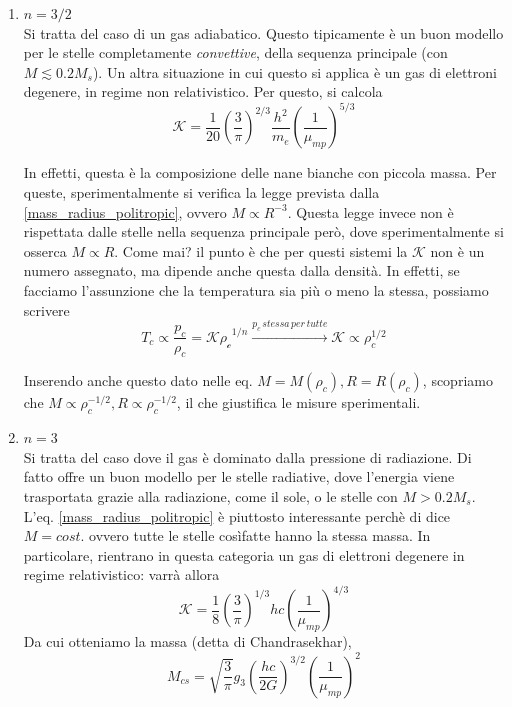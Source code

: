 \documentclass{report}
\begin{document}
    \begin{enumerate}
        \item $n = 3/2$ \\
        Si tratta del caso di un gas adiabatico. Questo tipicamente è un buon modello per le stelle completamente \emph{convettive}, della sequenza principale (con $M \lesssim 0.2 M_s$). Un altra situazione in cui questo si applica è un gas di elettroni degenere, in regime non relativistico. Per questo, si calcola
        \begin{equation}
            \mathcal{K} = \frac{1}{20}\left(\frac{3}{\pi} \right)^{2/3}\frac{h^2}{m_e}\left(\frac{1}{\mu_{mp}} \right)^{5/3}
        \end{equation}

        In effetti, questa è la composizione delle nane bianche con piccola massa.  Per queste, sperimentalmente si verifica la legge prevista dalla \ref{mass_radius_politropic}, ovvero $M \propto R^{-3}$. Questa legge invece non è rispettata dalle stelle nella sequenza principale però, dove sperimentalmente si osserca $M \propto R$. Come mai? il punto è che per questi sistemi la $\mathcal{K}$ non è un numero assegnato, ma dipende anche questa dalla densità. In effetti, se facciamo l'assunzione che la temperatura sia più o meno la stessa, possiamo scrivere 
        \begin{equation}
            T_c \propto \frac{p_c}{\rho_c} = \mathcal{K\rho_c}^{1/n} \xrightarrow{p_c \, stessa \, per \, tutte } \mathcal{K} \propto \rho_c^{1/2}
        \end{equation}

        Inserendo anche questo dato nelle eq. $M=M(\rho_c), R = R(\rho_c)$, scopriamo che $M \propto \rho_c^{-1/2}, R \propto \rho_c^{-1/2}$, il che giustifica le misure sperimentali. 
        \item $n=3$ \\
        Si tratta del caso dove il gas è dominato dalla pressione di radiazione. Di fatto offre un buon modello per le stelle radiative, dove l'energia viene trasportata grazie alla radiazione, come il sole, o le stelle con $M > 0.2 M_s$. L'eq. \ref{mass_radius_politropic} è piuttosto interessante perchè di dice $M = cost.$ ovvero tutte le stelle cosìfatte hanno la stessa massa. In particolare, rientrano in questa categoria un gas di elettroni degenere in regime relativistico: varrà allora 
        \begin{equation}
            \mathcal{K} = \frac{1}{8}\left(\frac{3}{\pi} \right)^{1/3}hc\left(\frac{1}{\mu_{mp}}\right)^{4/3}
        \end{equation}
        Da cui otteniamo la massa (detta di Chandrasekhar), 
        \begin{equation}
            M_{cs} = \sqrt{\frac{3}{\pi}}g_3\left(\frac{hc}{2G}\right)^{3/2}\left(\frac{1}{\mu_{mp}}\right)^2 
        \end{equation}
        
    \end{enumerate}
\end{document}
